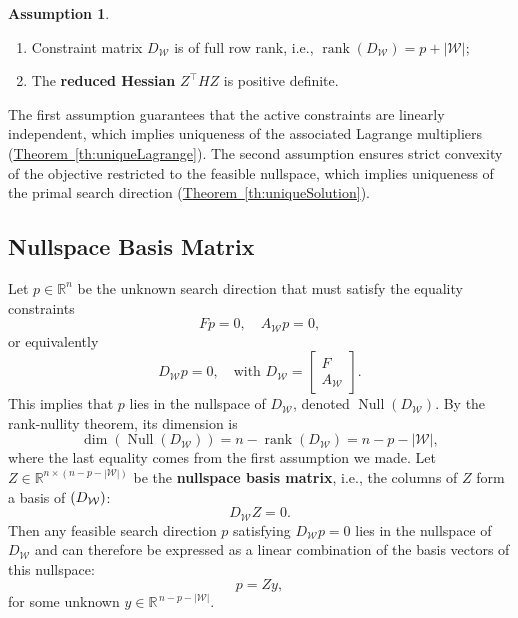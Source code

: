 \documentclass{book}
\theoremstyle{definition}
\newtheorem{assumption}[theorem]{Assumption}
\newcommand{\thref}[1]{\hyperref[#1]{Theorem~\ref*{#1}}}
\numberwithin{algorithm_}{chapter}
\begin{document}
\begin{assumption} \label{ass:uniqueness}
\leavevmode
\begin{enumerate}
\item \label{ass:rank}
Constraint matrix $D_{\mathcal{W}}$ is of full row rank, i.e., $\operatorname{rank}(D_{\mathcal{W}}) = p + |\mathcal{W}|$;

\item \label{ass:pd}
The \textbf{reduced Hessian} $Z^\top H Z$ is positive definite.
\end{enumerate}
\end{assumption}

The first assumption guarantees that the active constraints are linearly independent, which implies uniqueness of the associated Lagrange multipliers (\thref{th:uniqueLagrange}). The second assumption ensures strict convexity of the objective restricted to the feasible nullspace, which implies uniqueness of the primal search direction (\thref{th:uniqueSolution}).

\medskip

\subsection{Nullspace Basis Matrix}

Let $p \in \mathbb{R}^n$ be the unknown search direction that must satisfy the equality constraints
\begin{equation}
F p = 0, \quad A_{\mathcal{W}} p = 0,
\end{equation}
or equivalently
\begin{equation}
D_{\mathcal{W}} p = 0, \quad \text{with } D_{\mathcal{W}} = \begin{bmatrix} F \\ A_{\mathcal{W}} \end{bmatrix}.
\end{equation}
This implies that $p$ lies in the nullspace of $D_{\mathcal{W}}$, denoted $\operatorname{Null}(D_{\mathcal{W}})$. By the rank-nullity theorem, its dimension is
\begin{equation}
\dim(\operatorname{Null}(D_{\mathcal{W}})) = n - \operatorname{rank}(D_{\mathcal{W}}) = n - p - |\mathcal{W}|,
\end{equation}
where the last equality comes from the first assumption we made.  
Let $Z \in \mathbb{R}^{n \times (n - p - |\mathcal{W}|)}$ be the \textbf{nullspace basis matrix}, i.e., the columns of $Z$ form a basis of $\null(D_{\mathcal{W}})$:
\begin{equation}
D_{\mathcal{W}} Z = 0.
\end{equation}
Then any feasible search direction $p$ satisfying $D_{\mathcal{W}} p = 0$ lies in the nullspace of $D_{\mathcal{W}}$ and can therefore be expressed as a linear combination of the basis vectors of this nullspace:
\begin{equation}
p = Z y,
\end{equation}
for some unknown $y \in \mathbb{R}^{\,n - p - |\mathcal{W}|}$.
\end{document}
